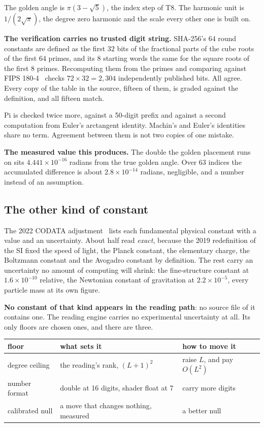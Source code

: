 The golden angle is \(\pi(3 - \sqrt{5})\), the index step of T8. The harmonic unit is \(1/(2\sqrt{\pi})\), the degree zero harmonic and the scale every other one is built on.

\textbf{The verification carries no trusted digit string.} SHA-256's \(64\) round constants are defined as the first \(32\) bits of the fractional parts of the cube roots of the first \(64\) primes, and its \(8\) starting words the same for the square roots of the first \(8\) primes. Recomputing them from the primes and comparing against FIPS 180-4~\cite[Section~4.2.2]{src:FIPS-180-4} checks \(72 \times 32 = 2{,}304\) independently published bits. All agree. Every copy of the table in the source, fifteen of them, is graded against the definition, and all fifteen match.

Pi is checked twice more, against a 50-digit prefix and against a second computation from Euler's arctangent identity. Machin's and Euler's identities share no term. Agreement between them is not two copies of one mistake.

\textbf{The measured value this produces.} The double the golden placement runs on sits \(4.441 \times 10^{-16}\) radians from the true golden angle. Over \(63\) indices the accumulated difference is about \(2.8 \times 10^{-14}\) radians, negligible, and a number instead of an assumption.

\subsection{The other kind of constant}

The 2022 CODATA adjustment~\cite[Table~XXXII]{src:Mohr-et-al-2025} lists each fundamental physical constant with a value and an uncertainty. About half read \emph{exact}, because the 2019 redefinition of the SI fixed the speed of light, the Planck constant, the elementary charge, the Boltzmann constant and the Avogadro constant by definition. The rest carry an uncertainty no amount of computing will shrink: the fine-structure constant at \(1.6 \times 10^{-10}\) relative, the Newtonian constant of gravitation at \(2.2 \times 10^{-5}\), every particle mass at its own figure.

\textbf{No constant of that kind appears in the reading path}: no source file of it contains one. The reading engine carries no experimental uncertainty at all. Its only floors are chosen ones, and there are three.

\begin{center}
\begin{tabular}{@{}lll@{}}
\toprule
floor & what sets it & how to move it \\
\midrule
degree ceiling & the reading's rank, \((L+1)^2\) & raise \(L\), and pay \(O(L^2)\) \\
number format & double at 16 digits, shader float at 7 & carry more digits \\
calibrated null & a move that changes nothing, measured & a better null \\
\bottomrule
\end{tabular}
\end{center}

